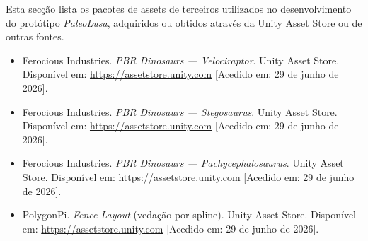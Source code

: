 \documentclass[a4paper,11pt]{report}
\begin{document}
Esta secção lista os pacotes de assets de terceiros utilizados no desenvolvimento
do protótipo \textit{PaleoLusa}, adquiridos ou obtidos através da Unity Asset Store
ou de outras fontes.

\begin{itemize}

    \item Ferocious Industries. \textit{PBR Dinosaurs --- Velociraptor}.
    Unity Asset Store. Disponível em:
    \url{https://assetstore.unity.com}
    [Acedido em: 29 de junho de 2026].

    \item Ferocious Industries. \textit{PBR Dinosaurs --- Stegosaurus}.
    Unity Asset Store. Disponível em:
    \url{https://assetstore.unity.com}
    [Acedido em: 29 de junho de 2026].

    \item Ferocious Industries. \textit{PBR Dinosaurs --- Pachycephalosaurus}.
    Unity Asset Store. Disponível em:
    \url{https://assetstore.unity.com}
    [Acedido em: 29 de junho de 2026].

    \item PolygonPi. \textit{Fence Layout} (vedação por spline).
    Unity Asset Store. Disponível em:
    \url{https://assetstore.unity.com}
    [Acedido em: 29 de junho de 2026].

\end{itemize}
\end{document}
